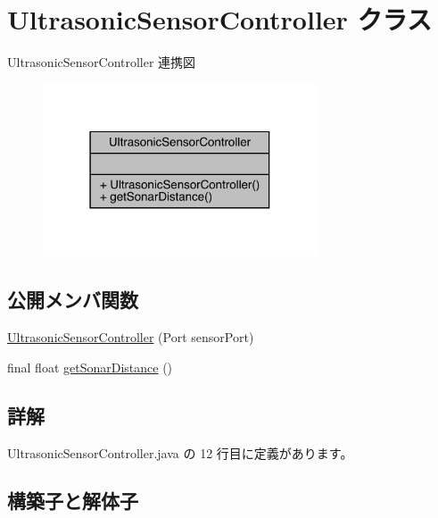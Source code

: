 \hypertarget{class_ultrasonic_sensor_controller}{}\section{Ultrasonic\+Sensor\+Controller クラス}
\label{class_ultrasonic_sensor_controller}


Ultrasonic\+Sensor\+Controller 連携図\nopagebreak
\begin{figure}[H]
\begin{center}
\leavevmode
\includegraphics[width=231pt]{dd/da5/class_ultrasonic_sensor_controller__coll__graph}
\end{center}
\end{figure}
\subsection*{公開メンバ関数}
\begin{DoxyCompactItemize}
\item 
\mbox{\hyperlink{class_ultrasonic_sensor_controller_aedb42488e2bdd7beabd4c3902ac4b58f}{Ultrasonic\+Sensor\+Controller}} (Port sensor\+Port)
\item 
final float \mbox{\hyperlink{class_ultrasonic_sensor_controller_ac1e9488c4e078022f294a83cc1c7fd70}{get\+Sonar\+Distance}} ()
\end{DoxyCompactItemize}


\subsection{詳解}


 Ultrasonic\+Sensor\+Controller.\+java の 12 行目に定義があります。



\subsection{構築子と解体子}
\mbox{\label{class_ultrasonic_sensor_controller_aedb42488e2bdd7beabd4c3902ac4b58f}} 
